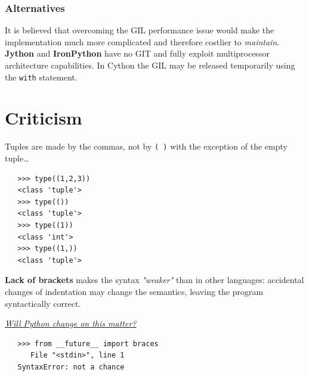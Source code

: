 \subsubsection{Alternatives}
It is believed that overcoming the GIL performance issue would make the
implementation much more complicated and therefore costlier to \textit{maintain}.
\textbf{Jython} and \textbf{IronPython} have no GIT and fully exploit multiprocessor architecture capabilities.
In Cython the GIL may be released temporarily using the \lstinline|with| statement.

\section{Criticism}
Tuples are made by the commas, not by \lstinline|( )| with the exception of the empty tuple…
\begin{lstlisting}
   >>> type((1,2,3))
   <class 'tuple'>
   >>> type(())
   <class 'tuple'>
   >>> type((1))
   <class 'int'>
   >>> type((1,))
   <class 'tuple'>
\end{lstlisting}

\textbf{Lack of brackets} makes the syntax \textit{"weaker"} than
in other languages:
accidental changes of
indentation may change the semantics, leaving
the program syntactically correct.
\begin{center}
\textit{\underline{Will Python change on this matter?}}
\end{center}
\begin{lstlisting}
   >>> from __future__ import braces
      File "<stdin>", line 1
   SyntaxError: not a chance
\end{lstlisting}